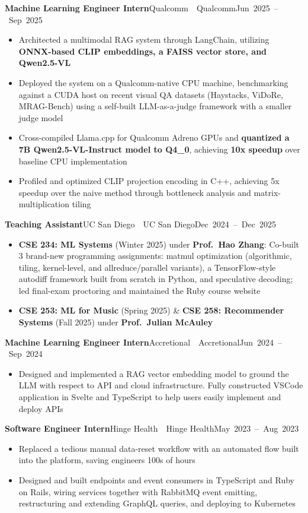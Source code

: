 \documentclass[letterpaper,11pt]{article}
\newcommand{\entry}[3]{%
  \needspace{4\baselineskip}%
  \textbf{#1}\ifx\relax#2\relax\else\ \textbar\ #2\fi\hfill\mbox{#3}\par}
\newenvironment{bullets}
  {\begin{itemize}[leftmargin=1.2em, label=\textbullet, itemsep=1.5pt, parsep=0pt, topsep=2.5pt, partopsep=0pt]}
  {\end{itemize}\vspace{7.7pt}}
\begin{document}
\entry{Machine Learning Engineer Intern}{Qualcomm}{Jun 2025 -- Sep 2025}
\begin{bullets}
  \item Architected a multimodal RAG system through LangChain, utilizing \textbf{ONNX-based CLIP embeddings, a FAISS vector store, and Qwen2.5-VL}
  \item Deployed the system on a Qualcomm-native CPU machine, benchmarking against a CUDA host on recent visual QA datasets (Haystacks, ViDoRe, MRAG-Bench) using a self-built LLM-as-a-judge framework with a smaller judge model
  \item Cross-compiled Llama.cpp for Qualcomm Adreno GPUs and \textbf{quantized a 7B Qwen2.5-VL-Instruct model to Q4\_0}, achieving \textbf{10x speedup} over baseline CPU implementation
  \item Profiled and optimized CLIP projection encoding in C++, achieving 5x speedup over the naive method through bottleneck analysis and matrix-multiplication tiling
\end{bullets}

\entry{Teaching Assistant}{UC San Diego}{Dec 2024 -- Dec 2025}
\begin{bullets}
  \item \textbf{CSE 234: ML Systems} (Winter 2025) under \textbf{Prof.\ Hao Zhang}: Co-built 3 brand-new programming assignments: matmul optimization (algorithmic, tiling, kernel-level, and allreduce/parallel variants), a TensorFlow-style autodiff framework built from scratch in Python, and speculative decoding; led final-exam proctoring and maintained the Ruby course website
  \item \textbf{CSE 253: ML for Music} (Spring 2025) \& \textbf{CSE 258: Recommender Systems} (Fall 2025) under \textbf{Prof.\ Julian McAuley}
\end{bullets}

\entry{Machine Learning Engineer Intern}{Accretional}{Jun 2024 -- Sep 2024}
\begin{bullets}
  \item Designed and implemented a RAG vector embedding model to ground the LLM with respect to API and cloud infrastructure. Fully constructed VSCode application in Svelte and TypeScript to help users easily implement and deploy APIs
\end{bullets}

\entry{Software Engineer Intern}{Hinge Health}{May 2023 -- Aug 2023}
\begin{bullets}
  \item Replaced a tedious manual data-reset workflow with an automated flow built into the platform, saving engineers 100s of hours
  \item Designed and built endpoints and event consumers in TypeScript and Ruby on Rails, wiring services together with RabbitMQ event emitting, restructuring and extending GraphQL queries, and deploying to Kubernetes
\end{bullets}
\end{document}
